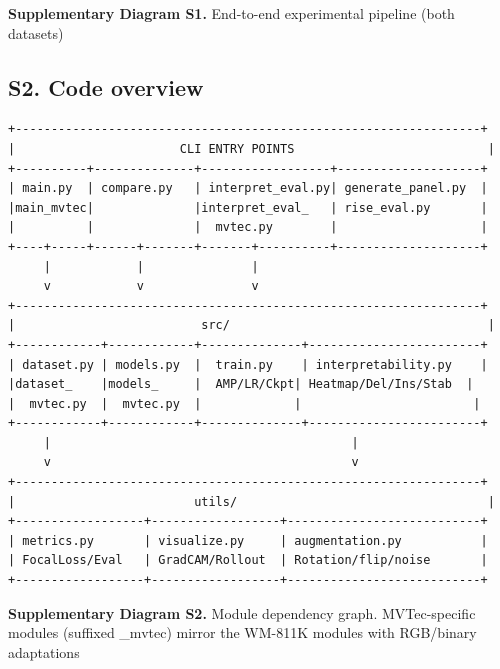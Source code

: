 \documentclass[11pt,a4paper]{article}
\begin{document}
\begin{center}
\small \textbf{Supplementary Diagram S1.} End-to-end experimental pipeline (both datasets)
\end{center}

\clearpage
{}
\subsection*{S2. Code overview}

\begin{Verbatim}
+-----------------------------------------------------------------+
|                       CLI ENTRY POINTS                           |
+----------+--------------+------------------+--------------------+
| main.py  | compare.py   | interpret_eval.py| generate_panel.py  |
|main_mvtec|              |interpret_eval_   | rise_eval.py       |
|          |              |  mvtec.py        |                    |
+----+-----+------+-------+-------+----------+--------------------+
     |            |               |
     v            v               v
+-----------------------------------------------------------------+
|                          src/                                    |
+------------+------------+--------------+------------------------+
| dataset.py | models.py  |  train.py    | interpretability.py    |
|dataset_    |models_     |  AMP/LR/Ckpt| Heatmap/Del/Ins/Stab  |
|  mvtec.py  |  mvtec.py  |             |                        |
+------------+------------+--------------+------------------------+
     |                                          |
     v                                          v
+-----------------------------------------------------------------+
|                         utils/                                   |
+------------------+------------------+---------------------------+
| metrics.py       | visualize.py     | augmentation.py           |
| FocalLoss/Eval   | GradCAM/Rollout  | Rotation/flip/noise       |
+------------------+------------------+---------------------------+
\end{Verbatim}

\begin{center}
\small \textbf{Supplementary Diagram S2.} Module dependency graph. MVTec-specific modules (suffixed \_mvtec) mirror the WM-811K modules with RGB/binary adaptations
\end{center}
\end{document}
